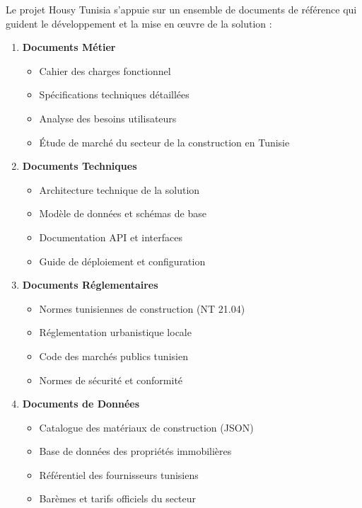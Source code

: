 Le projet Housy Tunisia s'appuie sur un ensemble de documents de référence qui guident le développement et la mise en œuvre de la solution :

\begin{enumerate}
    \item \textbf{Documents Métier}
    \begin{itemize}
        \item Cahier des charges fonctionnel
        \item Spécifications techniques détaillées
        \item Analyse des besoins utilisateurs
        \item Étude de marché du secteur de la construction en Tunisie
    \end{itemize}
    
    \item \textbf{Documents Techniques}
    \begin{itemize}
        \item Architecture technique de la solution
        \item Modèle de données et schémas de base
        \item Documentation API et interfaces
        \item Guide de déploiement et configuration
    \end{itemize}
    
    \item \textbf{Documents Réglementaires}
    \begin{itemize}
        \item Normes tunisiennes de construction (NT 21.04)
        \item Réglementation urbanistique locale
        \item Code des marchés publics tunisien
        \item Normes de sécurité et conformité
    \end{itemize}
    
    \item \textbf{Documents de Données}
    \begin{itemize}
        \item Catalogue des matériaux de construction (JSON)
        \item Base de données des propriétés immobilières
        \item Référentiel des fournisseurs tunisiens
        \item Barèmes et tarifs officiels du secteur
    \end{itemize}
\end{enumerate}

